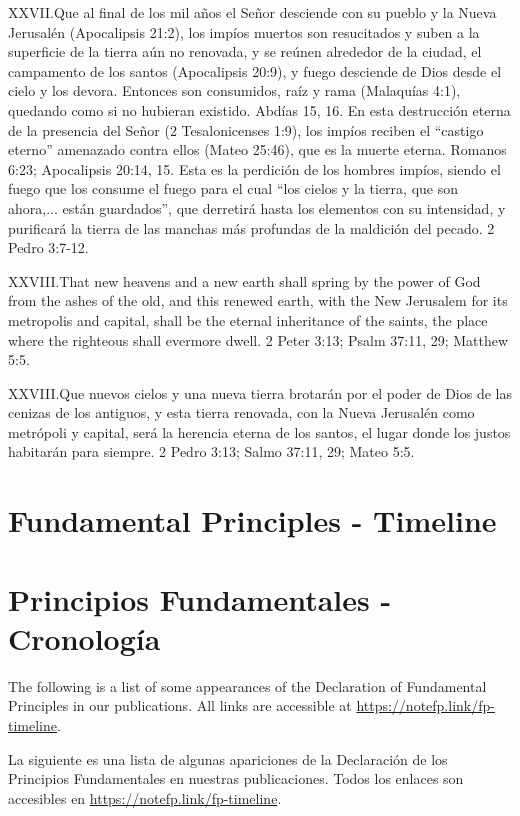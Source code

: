 \lettrine{XXVII.} Que al final de los mil años el Señor desciende con su pueblo y la Nueva Jerusalén (Apocalipsis 21:2), los impíos muertos son resucitados y suben a la superficie de la tierra aún no renovada, y se reúnen alrededor de la ciudad, el campamento de los santos (Apocalipsis 20:9), y fuego desciende de Dios desde el cielo y los devora. Entonces son consumidos, raíz y rama (Malaquías 4:1), quedando como si no hubieran existido. Abdías 15, 16. En esta destrucción eterna de la presencia del Señor (2 Tesalonicenses 1:9), los impíos reciben el “castigo eterno” amenazado contra ellos (Mateo 25:46), que es la muerte eterna. Romanos 6:23; Apocalipsis 20:14, 15. Esta es la perdición de los hombres impíos, siendo el fuego que los consume el fuego para el cual “los cielos y la tierra, que son ahora,... están guardados”, que derretirá hasta los elementos con su intensidad, y purificará la tierra de las manchas más profundas de la maldición del pecado. 2 Pedro 3:7-12.


\lettrine{XXVIII.} That new heavens and a new earth shall spring by the power of God from the ashes of the old, and this renewed earth, with the New Jerusalem for its metropolis and capital, shall be the eternal inheritance of the saints, the place where the righteous shall evermore dwell. 2 Peter 3:13; Psalm 37:11, 29; Matthew 5:5.


\lettrine{XXVIII.} Que nuevos cielos y una nueva tierra brotarán por el poder de Dios de las cenizas de los antiguos, y esta tierra renovada, con la Nueva Jerusalén como metrópoli y capital, será la herencia eterna de los santos, el lugar donde los justos habitarán para siempre. 2 Pedro 3:13; Salmo 37:11, 29; Mateo 5:5.


\section*{Fundamental Principles - Timeline} \label{appendix:timeline}


\section*{Principios Fundamentales - Cronología} \label{appendix:timeline}


The following is a list of some appearances of the Declaration of Fundamental Principles in our publications. All links are accessible at \href{https://notefp.link/fp-timeline}{https://notefp.link/fp-timeline}.


La siguiente es una lista de algunas apariciones de la Declaración de los Principios Fundamentales en nuestras publicaciones. Todos los enlaces son accesibles en \href{https://notefp.link/fp-timeline}{https://notefp.link/fp-timeline}.


